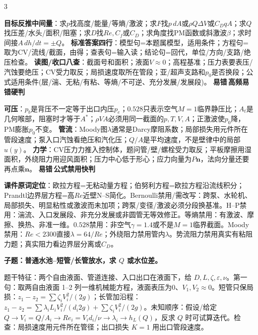 \documentclass[a4paper]{article}
\newcommand{\qt}[1]{\vspace{0.25pt}\colorbox{Q}{\parbox{\dimexpr\linewidth-2\fboxsep}{\color{white}\bfseries #1}}\par}
\newcommand{\ans}[1]{\colorbox{G}{\parbox{\dimexpr\linewidth-2\fboxsep}{#1}}\par}
\newcommand{\labtag}[3]{{\bfseries\color{#1}\colorbox{#1}{\color{white}\fontsize{2.35}{2.48}\selectfont #2}\,#3}\par}
\newcommand{\err}[1]{\labtag{R}{易错}{#1}}
\newcommand{\errq}[1]{\err{#1}}
\newenvironment{vfourWrap}{\par\begingroup\fontsize{2.68}{2.84}\selectfont\setlength{\fboxsep}{0.45pt}}{\par\endgroup}
\begin{document}
\begin{multicols}{3}
\begin{vfourWrap}
{\textbf{目标反推中间量}：求$p$找高度/能量/等熵/激波；求$F$找$p\,dA$或$\rho Q\Delta V$或$C_DqA$；求$Q$找压差/水头/面积/阻塞；求$D$找$Re,C_f$或$C_D$；求角度找PM函数或斜激波$\beta$；求时间接$A\,dh/dt=\pm Q$。 
\textbf{标准答案四行}：模型句=本题属\underline{\hspace{0.45cm}}模型，适用条件\underline{\hspace{0.45cm}}；方程句=取\underline{\hspace{0.4cm}}为CV/流线/截面，由\underline{\hspace{0.55cm}}得；查表句=输入\underline{\hspace{0.45cm}}读\underline{\hspace{0.45cm}}；结论句=回代，单位/方向/支路/绝压检查。 
\textbf{读图/收口八查}：截面号和面积；液面$V\approx0$；高程基准；压力表要表压/汽蚀要绝压；CV受力取反；局损速度取所在管段；亚/超声支路和$p_0$是否换段；公式适用条件(层/湍、无粘/有粘、等熵/不可逆、充分发展/发展段)。}
\errq{高频易错硬判}
{\fontsize{4.43}{4.53}\selectfont
\textbf{可压}：$p_b$是背压不一定等于出口内压$p_e$；$0.528$只表示空气$M=1$临界静压比；$A_t$是几何喉部，阻塞时才等于$A^*$；$\rho VA$必须用同一截面的$p,T,V,A$；正激波使$p_0$降，PM膨胀$p_0$不变。 
\textbf{管流}：Moody图$\lambda$通常是Darcy摩阻系数；局部损失用元件所在管段速度；泵入口汽蚀看绝压和汽化压；$Q/A$是平均速度，不是壁律中的局部$u(y)$。 
\textbf{力学}：CV压力力推入控制体，题问管/壁/螺栓受力取反；平板摩擦用湿面积，外绕阻力用迎风面积；压力中心低于形心；应力向量为$P\bm n$，法向分量还要再点乘$\bm n$。}
\errq{公式禁用快判}
{\fontsize{4.43}{4.53}\selectfont
\textbf{课件原词定位}：欧拉方程=无粘动量方程；伯努利方程=欧拉方程沿流线积分；Prandtl边界层方程=高$Re$近壁N--S简化。Bernoulli禁用/需改写：跨泵、水轮机、局部损失、明显粘性或激波而未加项；跨泵/变径/激波必须分段换基准。H--P禁用：湍流、入口发展段、非充分发展或非圆管无等效修正。等熵禁用：有激波、摩擦、换热、非准一维。$0.528$禁用：非空气$\gamma=1.4$或不是$M=1$临界截面。Moody禁用：$Re<2300$直接$\lambda=64/Re$；外绕阻力禁用管内$\lambda$。势流阻力禁用真实有粘阻力题；真实阻力看边界层分离或$C_D$。}
\end{vfourWrap}
\qt{子题：普通水池--短管/长管放水，求 $Q$ 或水位差。}
\ans{题干特征：两个自由液面、管道连接、入口出口在液面下，给 $D,L,\zeta,\varepsilon,\nu$。第一句：取两自由液面 1--2 列一维机械能方程，液面表压为0、$V_1,V_2\approx0$。短管只保局损：$z_1-z_2=\sum\zeta_i V_i^2/(2g)$；长管加沿程：$z_1-z_2=\sum\lambda_i L_iV_i^2/(d_i2g)+\sum\zeta_iV_i^2/(2g)$。未知顺序：假设/给定 $Q\to V_i=Q/A_i\to Re_i=V_id_i/\nu\to\lambda_i\to h_L(Q)$，反求 $Q$ 时可试算迭代。检查：局损速度用元件所在管径；出口损失 $K=1$ 用出口管段速度。}

\end{multicols}
\end{document}
